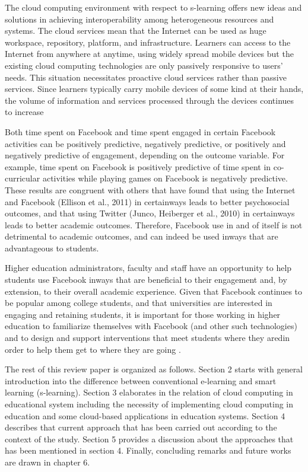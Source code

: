 \documentclass[journal]{vgtc}                %
\begin{document}
The cloud computing environment with respect to s-learning offers new ideas and solutions in achieving interoperability among heterogeneous resources and systems. The cloud services mean that the Internet can be used as huge workspace, repository, platform, and infrastructure. Learners can access to the Internet from anywhere at anytime, using widely spread mobile devices but the existing cloud computing technologies are only passively responsive to users’ needs. This situation necessitates proactive cloud services rather than passive services. Since learners typically carry mobile devices of some kind at their hands, the volume of information and services processed through the devices continues to increase

Both time spent on Facebook and time spent engaged in certain Facebook activities can be positively predictive, negatively predictive, or positively and negatively predictive of engagement, depending on the outcome variable. For example, time spent on Facebook is positively predictive of time spent in co-curricular activities while playing games on Facebook is negatively predictive. These results are congruent with others that have found that using the Internet and Facebook (Ellison et al., 2011) in certainways leads to better psychosocial outcomes, and that using Twitter (Junco, Heiberger et al., 2010) in certainways leads to better academic outcomes. Therefore, Facebook use in and of itself is not detrimental to academic outcomes, and can indeed be used inways that are advantageous to students.

Higher education administrators, faculty and staff have an opportunity to help students use Facebook inways that are beneficial to their engagement and, by extension, to their overall academic experience. Given that Facebook continues to be popular among college students, and that universities are interested in engaging and retaining students, it is important for those working in higher education to familiarize themselves with Facebook (and other such technologies) and to design and support interventions that meet students where they aredin order to help them get to where they are going \cite{Junco2012}.


The rest of this review paper is organized as follows. Section 2 starts with general introduction into the difference between conventional e-learning and smart learning (s-learning). Section 3 elaborates in the relation of cloud computing in educational system including the necessity of implementing cloud computing in education and some cloud-based applications in education systems. Section 4 describes that current approach that has been carried out according to the context of the study. Section 5 provides a discussion about the approaches that has been mentioned in section 4. Finally, concluding remarks and future works are drawn in chapter 6.
\end{document}
